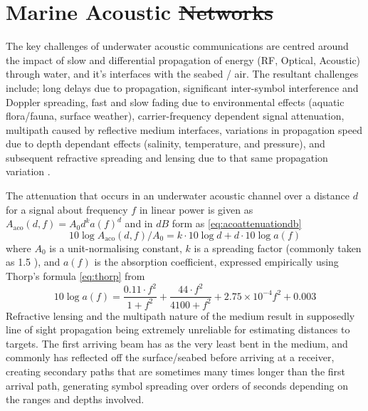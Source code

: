 \documentclass[conference]{IEEEtran}
\providecommand{\DIFadd}[1]{{\protect\color{blue}\uwave{#1}}} %
\providecommand{\DIFdel}[1]{{\protect\color{red}\sout{#1}}}                      %
\providecommand{\DIFaddbegin}{} %
\providecommand{\DIFaddend}{} %
\providecommand{\DIFdelbegin}{} %
\providecommand{\DIFdelend}{} %
\begin{document}
\section{Marine Acoustic \DIFdelbegin \DIFdel{Networks}\DIFdelend \DIFaddbegin \DIFadd{Communications}\DIFaddend }\label{sec:marineacousticnetworks}

The key challenges of underwater acoustic communications are centred around the impact of slow and differential propagation of energy (RF, Optical, Acoustic) through water, and it's interfaces with the seabed / air.
The resultant challenges include; long delays due to propagation, significant inter-symbol interference and Doppler spreading, fast and slow fading due to environmental effects (aquatic flora/fauna, surface weather), carrier-frequency dependent signal attenuation, multipath caused by reflective medium interfaces, variations in propagation speed due to depth dependant effects (salinity, temperature, and pressure), and subsequent refractive spreading and lensing due to that same propagation variation \cite{Partan2006}.

The attenuation that occurs in an underwater acoustic channel over a distance $d$ for a signal about frequency $f$ in linear power is given as $A_{\text{aco}}(d,f) = A_0d^ka(f)^d$ and in $dB$ form as \DIFdelbegin %
\DIFdelend \DIFaddbegin \eqref{eq:acoattenuationdb} 
\DIFaddend %
\begin{equation}
  \label{eq:acoattenuationdb}
  10 \log A_{\text{aco}}(d,f)/A_0 = k \cdot 10 \log d + d \cdot 10 \log a(f)
\end{equation}
%
where $A_0$ is a unit-normalising constant, $k$ is a spreading factor (commonly taken as 1.5 \cite{Stojanovic2011}), and $a(f)$ is the absorption coefficient, expressed empirically using Thorp's formula \eqref{eq:thorp} from \cite{Brekhovskikh1991}
%
\begin{equation}
  \label{eq:thorp}
  10 \log a(f) = \frac{0.11 \cdot f^2}{1+f^2} + \frac{44\cdot f^2}{4100+f^2}+ 2.75\times10^{-4} f^2 + 0.003
\end{equation}
%
Refractive lensing and the multipath nature of the medium result in supposedly line of sight propagation being extremely unreliable for estimating distances to targets.
The first arriving beam has as the very least bent in the medium, and commonly has reflected off the surface/seabed before arriving at a receiver, creating secondary paths that are sometimes many times longer than the first arrival path, generating symbol spreading over orders of seconds depending on the ranges and depths involved.
\end{document}
